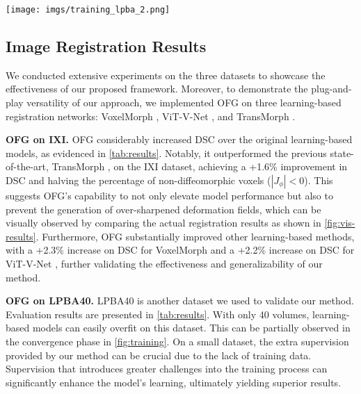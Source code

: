 \documentclass[10pt,twocolumn,letterpaper]{article}
\begin{document}
\begin{figure*}[t]
    \begin{center}
       \texttt{[image: imgs/training\_lpba\_2.png]}
    \end{center}
    \caption{Visualization of training process vs. validation DSC for models on LPBA40. The self-training strategy utilizes deformation fields from a pre-trained network as pseudo-ground truth. In contrast, optimized self-training iteratively refines the deformation these fields, and then uses them as pseudo-ground truth. Our proposed method is highlighted for its superior outcomes. Notably, self-training schema underperforms, primarily due to complexities in convergence.}
    \label{fig:training}
\end{figure*}

\subsection{Image Registration Results}

We conducted extensive experiments on the three datasets to showcase the effectiveness of our proposed framework. Moreover, to demonstrate the plug-and-play versatility of our approach, we implemented OFG on three learning-based registration networks: VoxelMorph \cite{Balakrishnan_2019}, ViT-V-Net \cite{chen2021vitvnet}, and TransMorph \cite{Chen_2022}.


\textbf{OFG on IXI.} OFG considerably increased DSC over the original learning-based models, as evidenced in \cref{tab:results}. Notably, it outperformed the previous state-of-the-art, TransMorph \cite{Chen_2022}, on the IXI dataset, achieving a +1.6\% improvement in DSC and halving the percentage of non-diffeomorphic voxels ($|J_{\phi}| < 0$). This suggests OFG's capability to not only elevate model performance but also to prevent the generation of over-sharpened deformation fields, which can be visually observed by comparing the actual registration results as shown in \cref{fig:vis-results}.
Furthermore, OFG substantially improved other learning-based methods, with a +2.3\% increase on DSC for VoxelMorph \cite{Balakrishnan_2019} and a +2.2\% increase on DSC for ViT-V-Net \cite{chen2021vitvnet}, further validating the effectiveness and generalizability of our method.




\textbf{OFG on LPBA40.} LPBA40 \cite{lpba} is another dataset we used to validate our method. Evaluation results are presented in \cref{tab:results}. With only 40 volumes, learning-based models can easily overfit on this dataset. This can be partially observed in the convergence phase in \cref{fig:training}.
On a small dataset, the extra supervision provided by our method can be crucial due to the lack of training data. Supervision that introduces greater challenges into the training process can significantly enhance the model's learning, ultimately yielding superior results.
\end{document}
